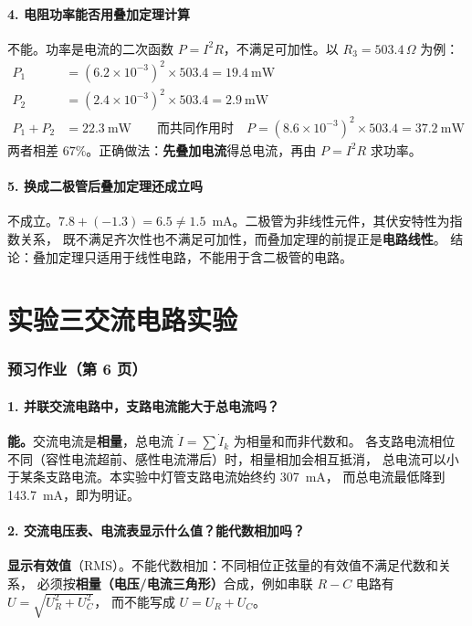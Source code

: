 \documentclass[UTF8,a4paper,10.5pt]{ctexart}
\newcommand{\key}[1]{\textbf{\color{acc}#1}}
\newcommand{\warn}[1]{\textcolor{warnc}{#1}}
\begin{document}
\subsection*{4. 电阻功率能否用叠加定理计算}
\warn{不能}。功率是电流的二次函数 $P=I^2R$，不满足可加性。以 $R_3=503.4\,\Omega$ 为例：
\begin{align*}
P_1&=(6.2\times10^{-3})^2\times503.4=19.4\ \text{mW}\\
P_2&=(2.4\times10^{-3})^2\times503.4=2.9\ \text{mW}\\
P_1+P_2&=22.3\ \text{mW}\qquad\text{而共同作用时}\quad P=(8.6\times10^{-3})^2\times503.4=37.2\ \text{mW}
\end{align*}
两者相差 $67\%$。正确做法：\key{先叠加电流}得总电流，再由 $P=I^2R$ 求功率。

\subsection*{5. 换成二极管后叠加定理还成立吗}
\warn{不成立}。$7.8+(-1.3)=6.5\neq1.5$~mA。二极管为非线性元件，其伏安特性为指数关系，
既不满足齐次性也不满足可加性，而叠加定理的前提正是\key{电路线性}。
结论：叠加定理只适用于线性电路，不能用于含二极管的电路。

\newpage
\part*{\centering\color{acc} 实验三\quad 交流电路实验}

\section{预习作业（第 6 页）}

\subsection*{1. 并联交流电路中，支路电流能大于总电流吗？}
\key{能。}交流电流是\key{相量}，总电流 $\dot I=\sum\dot I_k$ 为相量和而非代数和。
各支路电流相位不同（容性电流超前、感性电流滞后）时，相量相加会相互抵消，
总电流可以小于某条支路电流。本实验中灯管支路电流始终约 307~mA，
而总电流最低降到 143.7~mA，即为明证。

\subsection*{2. 交流电压表、电流表显示什么值？能代数相加吗？}
\key{显示有效值}（RMS）。不能代数相加：不同相位正弦量的有效值不满足代数和关系，
必须按\key{相量（电压/电流三角形）}合成，例如串联 $R-C$ 电路有 $U=\sqrt{U_R^2+U_C^2}$，
而不能写成 $U=U_R+U_C$。
\end{document}
